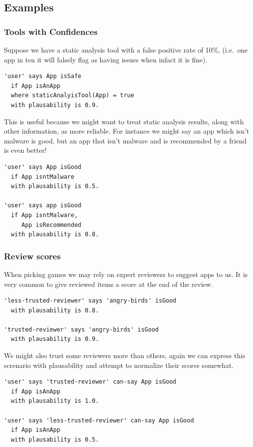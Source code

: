 \documentclass[thesis.tex]{subfiles}
\begin{document}
\subsection{Examples}

\subsubsection{Tools with Confidences}

Suppose we have a static analysis tool with a false positive rate of
10\%, (i.e.~one app in ten it will falsely flag as having issues when
infact it is fine).

\begin{lstlisting}
'user' says App isSafe
  if App isAnApp
  where staticAnalyisTool(App) = true
  with plausability is 0.9.
\end{lstlisting}

This is useful because we might want to treat static analysis results,
along with other information, as more reliable.  For instance we might
say an app which isn't malware is good, but an app that isn't malware
and is recommended by a friend is even better!

\begin{lstlisting}
'user' says App isGood
  if App isntMalware
  with plausability is 0.5.

'user' says app isGood
  if App isntMalware,
     App isRecommended
  with plausability is 0.8.
\end{lstlisting}

\subsubsection{Review scores}

When picking games we may rely on expert reviewers to suggest apps to
us.  It is very common to give reviewed items a score at the end of
the review.

\begin{lstlisting}
'less-trusted-reviewer' says 'angry-birds' isGood
  with plausability is 0.8.

'trusted-reviewer' says 'angry-birds' isGood
  with plausability is 0.9.
\end{lstlisting}

We might also trust some reviewers more than others, again we can
express this screnario with plausability and attempt to normalize
their scores somewhat.

\begin{lstlisting}
'user' says 'trusted-reviewer' can-say App isGood
  if App isAnApp
  with plausability is 1.0.

'user' says 'less-trusted-reviewer' can-say App isGood
  if App isAnApp
  with plausability is 0.5.
\end{lstlisting}
\end{document}
